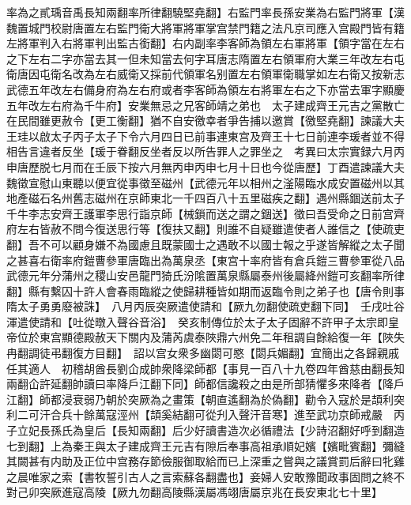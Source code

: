 率為之貳瑀音禹長知兩翻率所律翻驍堅堯翻】右監門率長孫安業為右監門將軍【漢魏置城門校尉唐置左右監門衛大將軍將軍掌宫禁門籍之法凡京司應入宫殿門皆有籍左將軍判入右將軍判出監古銜翻】右内副率李客師為領左右軍將軍【領字當在左右之下左右二字亦當去其一但未知當去何字耳唐志隋置左右領軍府大業三年改左右屯衛唐因屯衛名改為左右威衛又採前代領軍名别置左右領軍衛職掌如左右衛又按新志武德五年改左右備身府為左右府或者李客師為領左右將軍左右之下亦當去軍字顯慶五年改左右府為千牛府】安業無忌之兄客師靖之弟也　太子建成齊王元吉之黨散亡在民間雖更赦令【更工衡翻】猶不自安徼幸者爭告捕以邀賞【徼堅堯翻】諫議大夫王珪以啟太子丙子太子下令六月四日已前事連東宫及齊王十七日前連李瑗者並不得相告言違者反坐【瑗于眷翻反坐者反以所告罪人之罪坐之　考異曰太宗實録六月丙申唐歷脱七月而在壬辰下按六月無丙申丙申七月十日也今從唐歷】丁酉遣諫議大夫魏徵宣慰山東聽以便宜從事徵至磁州【武德元年以相州之滏陽臨水成安置磁州以其地產磁石名州舊志磁州在京師東北一千四百八十五里磁疾之翻】遇州縣錮送前太子千牛李志安齊王護軍李思行詣京師【械鎖而送之謂之錮送】徵曰吾受命之日前宫齊府左右皆赦不問今復送思行等【復扶又翻】則誰不自疑雖遣使者人誰信之【使疏吏翻】吾不可以顧身嫌不為國慮且既蒙國士之遇敢不以國士報之乎遂皆解縱之太子聞之甚喜右衛率府鎧曹參軍唐臨出為萬泉丞【東宫十率府皆有倉兵鎧三曹參軍從八品武德元年分蒲州之稷山安邑龍門猗氏汾隂置萬泉縣屬泰州後屬絳州鎧可亥翻率所律翻】縣有繫囚十許人會春雨臨縱之使歸耕種皆如期而返臨令則之弟子也【唐令則事隋太子勇勇廢被誅】　八月丙辰突厥遣使請和【厥九勿翻使疏吏翻下同】　壬戌吐谷渾遣使請和【吐從暾入聲谷音浴】　癸亥制傳位於太子太子固辭不許甲子太宗即皇帝位於東宫顯德殿赦天下關内及蒲芮虞泰陜鼎六州免二年租調自餘給復一年【陜失冉翻調徒弔翻復方目翻】　詔以宫女衆多幽閟可愍【閟兵媚翻】宜簡出之各歸親戚任其適人　初稽胡酋長劉仚成帥衆降梁師都【事見一百八十九卷四年酋慈由翻長知兩翻仚許延翻帥讀曰率降戶江翻下同】師都信讒殺之由是所部猜懼多來降者【降戶江翻】師都浸衰弱乃朝於突厥為之畫策【朝直遙翻為於偽翻】勸令入寇於是頡利突利二可汗合兵十餘萬寇涇州【頡奚結翻可從刋入聲汗音寒】進至武功京師戒嚴　丙子立妃長孫氏為皇后【長知兩翻】后少好讀書造次必循禮法【少詩沼翻好呼到翻造七到翻】上為秦王與太子建成齊王元吉有隙后奉事高祖承順妃嬪【嬪毗賓翻】彌縫其闕甚有内助及正位中宫務存節儉服御取給而已上深重之嘗與之議賞罰后辭曰牝雞之晨唯家之索【書牧誓引古人之言索蘇各翻盡也】妾婦人安敢豫聞政事固問之終不對己卯突厥進寇高陵【厥九勿翻高陵縣漢屬馮翊唐屬京兆在長安東北七十里】

